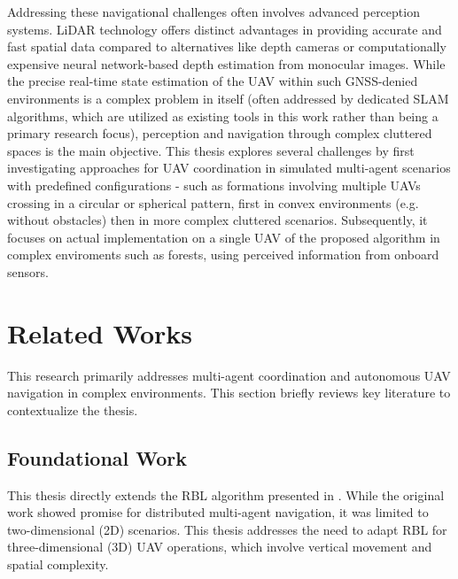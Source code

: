 Addressing these navigational challenges often involves advanced perception systems. 
\ac{LiDAR} technology offers distinct advantages in providing accurate and fast spatial data compared to alternatives like depth cameras or computationally expensive neural network-based depth estimation from monocular images. 
While the precise real-time state estimation of the \ac{UAV} within such \ac{GNSS}-denied environments is a complex problem in itself (often addressed by dedicated \ac{SLAM} algorithms, which are utilized as existing tools in this work rather than being a primary research focus), perception and navigation through complex cluttered spaces is the main objective.
This thesis explores several challenges by first investigating approaches for \ac{UAV} coordination in simulated multi-agent scenarios with predefined configurations - such as formations involving multiple \ac{UAV}s crossing in a circular or spherical pattern, first in convex environments (e.g. without obstacles) then in more complex cluttered scenarios. 
Subsequently, it focuses on actual implementation on a single \ac{UAV} of the proposed algorithm in complex enviroments such as forests, using perceived information from onboard sensors.

\section{Related Works}

  This research primarily addresses multi-agent coordination and autonomous UAV navigation in complex environments. 
  This section briefly reviews key literature to contextualize the thesis.
  \subsection{Foundational Work}
    This thesis directly extends the \ac{RBL} algorithm presented in \cite{rbl_paper}. 
    While the original work showed promise for distributed multi-agent navigation, it was limited to two-dimensional (2D) scenarios. 
    This thesis addresses the need to adapt \ac{RBL} for three-dimensional (3D) \ac{UAV} operations, which involve vertical movement and spatial complexity.

